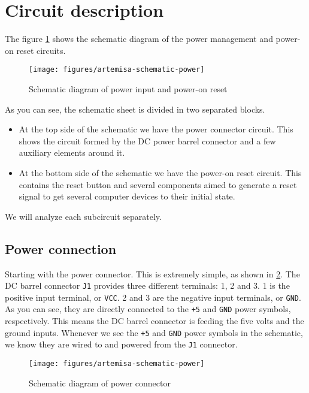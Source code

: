 \section{Circuit description}

The figure \ref{fig:artemisa-schematic-power} shows the schematic diagram of the power management and power-on reset circuits.

\begin{figure}[htbp]
  \centering
  \texttt{[image: figures/artemisa-schematic-power]}
  \caption{Schematic diagram of power input and power-on reset}
  \label{fig:artemisa-schematic-power}
\end{figure}

As you can see, the schematic sheet is divided in two separated blocks.

\begin{itemize}
  \item At the top side of the schematic we have the power connector circuit. This shows the circuit formed by the DC power barrel connector and a few auxiliary elements around it.
  \item At the bottom side of the schematic we have the power-on reset circuit. This contains the reset button and several components aimed to generate a reset signal to get several computer devices to their initial state.
\end{itemize}

We will analyze each subcircuit separately.

\subsection{Power connection}

Starting with the power connector. This is extremely simple, as shown in \ref{fig:artemisa-schematic-power-conn}. The DC barrel connector {\tt J1} provides three different terminals: 1, 2 and 3. 1 is the positive input terminal, or {\tt VCC}. 2 and 3 are the negative input terminals, or {\tt GND}. As you can see, they are directly connected to the {\tt +5} and {\tt GND} power symbols, respectively. This means the DC barrel connector is feeding the five volts and the ground inputs. Whenever we see the {\tt +5} and {\tt GND} power symbols in the schematic, we know they are wired to and powered from the {\tt J1} connector.

\begin{figure}[htbp]
  \centering
  \texttt{[image: figures/artemisa-schematic-power]}
  \caption{Schematic diagram of power connector}
  \label{fig:artemisa-schematic-power-conn}
\end{figure}

